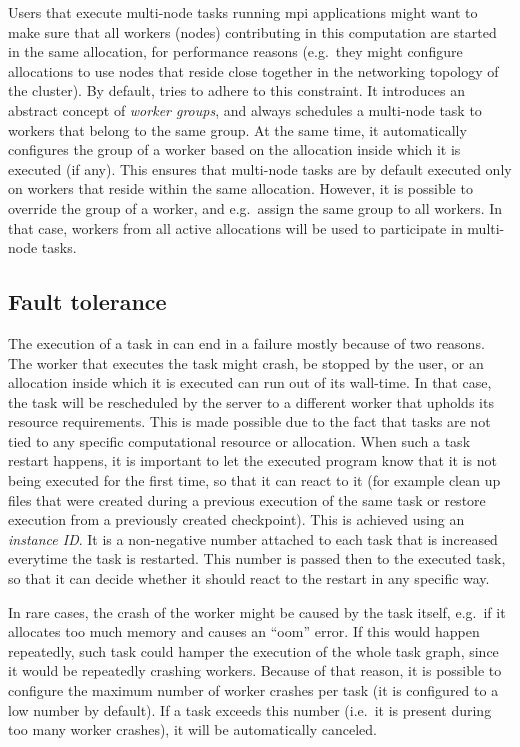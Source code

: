 Users that execute multi-node tasks running \gls{mpi} applications might want to make
sure that all workers (nodes) contributing in this computation are started in the same allocation,
for performance reasons (e.g.\ they might configure allocations to use nodes that reside close
together in the networking topology of the cluster). By default, \hyperqueue{} tries to
adhere to this constraint. It introduces an abstract concept of \emph{worker groups}, and always
schedules a multi-node task to workers that belong to the same group. At the same time, it
automatically configures the group of a worker based on the allocation inside which it is executed
(if any). This ensures that multi-node tasks are by default executed only on workers that reside
within the same allocation. However, it is possible to override the group of a worker, and e.g.\
assign the same group to all workers. In that case, workers from all active allocations will be
used to participate in multi-node tasks.


\subsection{Fault tolerance}
The execution of a task in \hyperqueue{} can end in a failure mostly because of two
reasons. The worker that executes the task might crash, be stopped by the user, or an allocation
inside which it is executed can run out of its wall-time. In that case, the task will be
rescheduled by the server to a different worker that upholds its resource requirements. This is
made possible due to the fact that tasks are not tied to any specific computational resource or
allocation. When such a task restart happens, it is important to let the executed program know that
it is not being executed for the first time, so that it can react to it (for example clean up files
that were created during a previous execution of the same task or restore execution from a
previously created checkpoint). This is achieved using an \emph{instance ID}. It is a
non-negative number attached to each task that is increased everytime the task is restarted. This
number is passed then to the executed task, so that it can decide whether it should react to the
restart in any specific way.

In rare cases, the crash of the worker might be caused by the task itself, e.g.\ if it allocates
too much memory and causes an ``\gls{oom}'' error. If this would happen repeatedly,
such task could hamper the execution of the whole task graph, since it would be repeatedly crashing
workers. Because of that reason, it is possible to configure the maximum number of worker crashes
per task (it is configured to a low number by default). If a task exceeds this number (i.e.\ it is
present during too many worker crashes), it will be automatically canceled.

